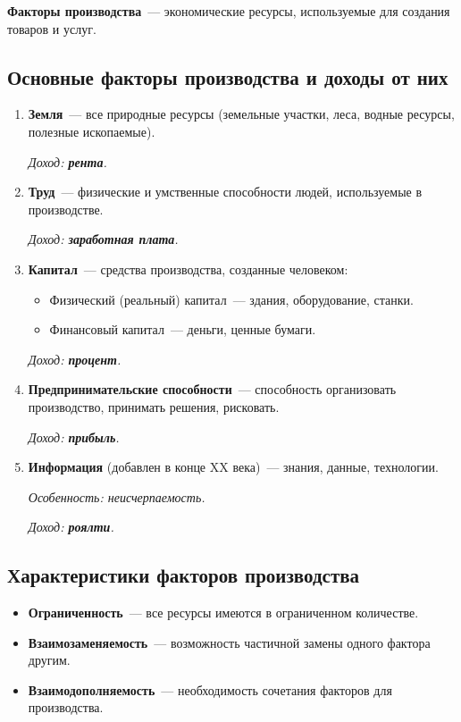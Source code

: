 \documentclass[12pt]{article}
\begin{document}
	\textbf{Факторы производства}~--- экономические ресурсы, используемые для создания товаров и услуг.
	
	\subsection{Основные факторы производства и доходы от них}
	
	\begin{enumerate}
		\item \textbf{Земля}~--- все природные ресурсы (земельные участки, леса, водные ресурсы, полезные ископаемые).
		
		\textit{Доход: \textbf{рента}.}
		
		\item \textbf{Труд}~--- физические и умственные способности людей, используемые в производстве.
		
		\textit{Доход: \textbf{заработная плата}.}
		
		\item \textbf{Капитал}~--- средства производства, созданные человеком:
		\begin{itemize}
			\item Физический (реальный) капитал~--- здания, оборудование, станки.
			\item Финансовый капитал~--- деньги, ценные бумаги.
		\end{itemize}
		
		\textit{Доход: \textbf{процент}.}
		
		\item \textbf{Предпринимательские способности}~--- способность организовать производство, принимать решения, рисковать.
		
		\textit{Доход: \textbf{прибыль}.}
		
		\item \textbf{Информация} (добавлен в конце XX века)~--- знания, данные, технологии.
		
		\textit{Особенность: неисчерпаемость.}
		
		\textit{Доход: \textbf{роялти}.}
	\end{enumerate}
	
	\subsection{Характеристики факторов производства}
	\begin{itemize}
		\item \textbf{Ограниченность}~--- все ресурсы имеются в ограниченном количестве.
		\item \textbf{Взаимозаменяемость}~--- возможность частичной замены одного фактора другим.
		\item \textbf{Взаимодополняемость}~--- необходимость сочетания факторов для производства.
	\end{itemize}
	
\end{document}

